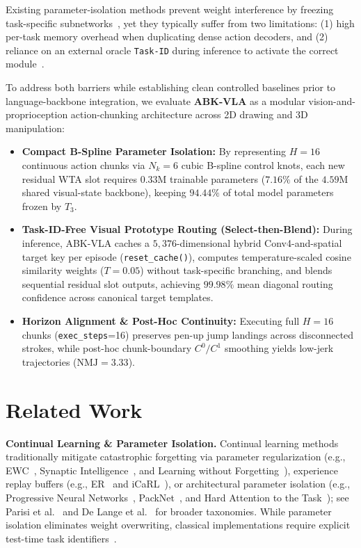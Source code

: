 \documentclass[10pt,twocolumn]{article}
\begin{document}
Existing parameter-isolation methods prevent weight interference by freezing task-specific subnetworks~\cite{rusu2016,mallya2018,serra2018}, yet they typically suffer from two limitations: (1) high per-task memory overhead when duplicating dense action decoders, and (2) reliance on an external oracle \texttt{Task-ID} during inference to activate the correct module~\cite{farquhar2018}.

To address both barriers while establishing clean controlled baselines prior to language-backbone integration, we evaluate \textbf{ABK-VLA} as a modular vision-and-proprioception action-chunking architecture across 2D drawing and 3D manipulation:
\begin{itemize}
    \item \textbf{Compact B-Spline Parameter Isolation:} By representing $H=16$ continuous action chunks via $N_k=6$ cubic B-spline control knots, each new residual WTA slot requires $0.33\text{M}$ trainable parameters ($7.16\%$ of the $4.59\text{M}$ shared visual-state backbone), keeping $94.44\%$ of total model parameters frozen by $T_3$.
    \item \textbf{Task-ID-Free Visual Prototype Routing (Select-then-Blend):} During inference, ABK-VLA caches a $5{,}376$-dimensional hybrid Conv4-and-spatial target key per episode (\texttt{reset\_cache()}), computes temperature-scaled cosine similarity weights ($T=0.05$) without task-specific branching, and blends sequential residual slot outputs, achieving $99.98\%$ mean diagonal routing confidence across canonical target templates.
    \item \textbf{Horizon Alignment \& Post-Hoc Continuity:} Executing full $H=16$ chunks (\texttt{exec\_steps}=16) preserves pen-up jump landings across disconnected strokes, while post-hoc chunk-boundary $C^0/C^1$ smoothing yields low-jerk trajectories ($\mathrm{NMJ}=3.33$).
\end{itemize}

\section{Related Work}
\textbf{Continual Learning \& Parameter Isolation.} Continual learning methods traditionally mitigate catastrophic forgetting via parameter regularization (e.g., EWC~\cite{kirkpatrick2017}, Synaptic Intelligence~\cite{zenke2017}, and Learning without Forgetting~\cite{li2017}), experience replay buffers (e.g., ER~\cite{rolnick2019} and iCaRL~\cite{rebuffi2017}), or architectural parameter isolation (e.g., Progressive Neural Networks~\cite{rusu2016}, PackNet~\cite{mallya2018}, and Hard Attention to the Task~\cite{serra2018}); see Parisi et al.~\cite{parisi2019} and De Lange et al.~\cite{delange2022} for broader taxonomies. While parameter isolation eliminates weight overwriting, classical implementations require explicit test-time task identifiers~\cite{farquhar2018}.
\end{document}
